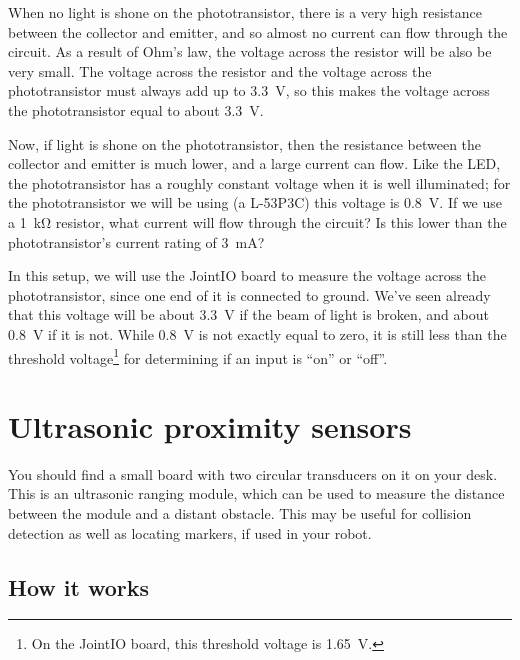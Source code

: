 \documentclass{article}
\begin{document}
When no light is shone on the phototransistor, there is a very high resistance
between the collector and emitter, and so almost no current can flow through
the circuit. As a result of Ohm's law, the voltage across the resistor will be
also be very small. The voltage across the resistor and the voltage across the
phototransistor must always add up to \SI{3.3}{\volt}, so this makes the
voltage across the phototransistor equal to about \SI{3.3}{\volt}.

Now, if light is shone on the phototransistor, then the resistance between the
collector and emitter is much lower, and a large current can flow. Like the LED,
the phototransistor has a roughly constant voltage when it is well illuminated;
for the phototransistor we will be using (a L-53P3C) this voltage is
\SI{0.8}{\volt}. If we use a \SI{1}{\kilo\ohm} resistor, what current will flow
through the circuit? Is this lower than the phototransistor's current rating of
\SI{3}{\milli\ampere}?

In this setup, we will use the JointIO board to measure the voltage across the
phototransistor, since one end of it is connected to ground. We've seen already
that this voltage will be about \SI{3.3}{\volt} if the beam of light is broken,
and about \SI{0.8}{\volt} if it is not. While \SI{0.8}{\volt} is not exactly
equal to zero, it is still less than the threshold voltage\footnote{On the
JointIO board, this threshold voltage is \SI{1.65}{\volt}.} for determining
if an input is ``on'' or ``off''.



\section{Ultrasonic proximity sensors}

You should find a small board with two circular transducers on it on your desk.
This is an ultrasonic ranging module, which can be used to measure the distance
between the module and a distant obstacle. This may be useful for collision
detection as well as locating markers, if used in your robot.

\subsection{How it works}
\end{document}

